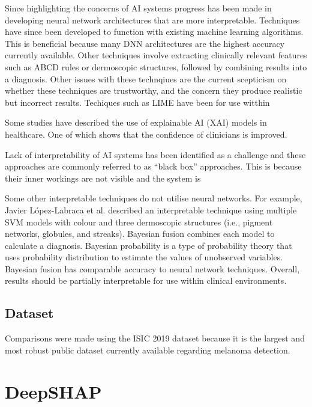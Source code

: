 Since highlighting the concerns of AI systems progress has been made in developing neural network architectures that are more interpretable. Techniques have since been developed to function with existing machine learning algorithms\cite{Fuji2019, Selvaraju2016, Ribeiro2016}. This is beneficial because many DNN architectures are the highest accuracy currently available\cite{}. Other techniques\cite{} involve extracting clinically relevant features such as ABCD rules or dermoscopic structures, followed by combining results into a diagnosis. Other issues with these technqiues are the current scepticism on whether these techniques are trustworthy\cite{Tjoa2019, Samek2019a}, and the concern they produce realistic but incorrect results\cite{Ghorbani2019}. Techiques such as LIME have been for use witthin

Some studies have described the use of explainable AI (XAI) models in healthcare\cite{}. One of which shows that the confidence of clinicians is improved.

Lack of interpretability of AI systems has been identified as a challenge and these approaches are commonly referred to as ``black box'' approaches. This is because their inner workings are not visible and the system is

Some other interpretable techniques do not utilise neural networks. For example, Javier López-Labraca et al.\cite{Lopez-Labraca2018} described an interpretable technique using multiple SVM models with colour and three dermoscopic structures (i.e., pigment networks, globules, and streaks). Bayesian fusion combines each model to calculate a diagnosis. Bayesian probability is a type of probability theory that uses probability distribution to estimate the values of unobserved variables. Bayesian fusion has comparable accuracy to neural network techniques\cite{Takruri2017}. Overall, results should be partially interpretable for use within clinical environments.


\subsection{Dataset}
Comparisons were made using the ISIC 2019 dataset because it is the largest and most robust public dataset currently available regarding melanoma detection.

\section{DeepSHAP}


